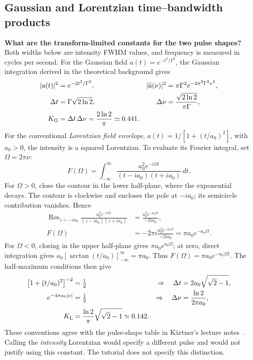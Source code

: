 \subsection{Gaussian and Lorentzian time--bandwidth products}
\textbf{What are the transform-limited constants for the two pulse shapes?}
Both widths below are intensity FWHM values, and frequency is measured in cycles per second. For the Gaussian field $a(t)=e^{-t^2/\Gamma^2}$, the Gaussian integration derived in the theoretical background gives
\begin{align}
|a(t)|^2&=e^{-2t^2/\Gamma^2},&
|\widetilde a(\nu)|^2&=\pi\Gamma^2e^{-2\pi^2\Gamma^2\nu^2},\\
\Delta t&=\Gamma\sqrt{2\ln2},&
\Delta\nu&=\frac{\sqrt{2\ln2}}{\pi\Gamma},\\
K_{\rm G}&=\Delta t\,\Delta\nu=\frac{2\ln2}{\pi}\simeq0.441.
\end{align}
For the conventional \emph{Lorentzian field envelope}, $a(t)=1/[1+(t/a_0)^2]$, with $a_0>0$, the intensity is a squared Lorentzian. To evaluate its Fourier integral, set $\Omega=2\pi\nu$:
\begin{equation}
F(\Omega)=\int_{-\infty}^{\infty}
\frac{a_0^2e^{-i\Omega t}}{(t-ia_0)(t+ia_0)}\,dt.
\end{equation}
For $\Omega>0$, close the contour in the lower half-plane, where the exponential decays. The contour is clockwise and encloses the pole at $-ia_0$; its semicircle contribution vanishes. Hence
\begin{align}
\operatorname{Res}_{z=-ia_0}
\frac{a_0^2e^{-i\Omega z}}{(z-ia_0)(z+ia_0)}
&=\frac{a_0^2e^{-a_0\Omega}}{-2ia_0},\\
F(\Omega)&=-2\pi i\frac{a_0^2e^{-a_0\Omega}}{-2ia_0}
=\pi a_0e^{-a_0\Omega}.
\end{align}
For $\Omega<0$, closing in the upper half-plane gives $\pi a_0e^{a_0\Omega}$; at zero, direct integration gives $a_0[\arctan(t/a_0)]_{-\infty}^{\infty}=\pi a_0$. Thus $F(\Omega)=\pi a_0e^{-a_0|\Omega|}$. The half-maximum conditions then give
\begin{align}
\bigl[1+(t/a_0)^2\bigr]^{-2}&=\tfrac12
&\Rightarrow\quad \Delta t&=2a_0\sqrt{\sqrt2-1},\\
e^{-4\pi a_0|\nu|}&=\tfrac12
&\Rightarrow\quad \Delta\nu&=\frac{\ln2}{2\pi a_0},\\
K_{\rm L}&=\frac{\ln2}{\pi}\sqrt{\sqrt2-1}\simeq0.142.
\end{align}
These conventions agree with the pulse-shape table in Kärtner's lecture notes~\cite{kaertner}. Calling the \emph{intensity} Lorentzian would specify a different pulse and would not justify using this constant. The tutorial does not specify this distinction.

